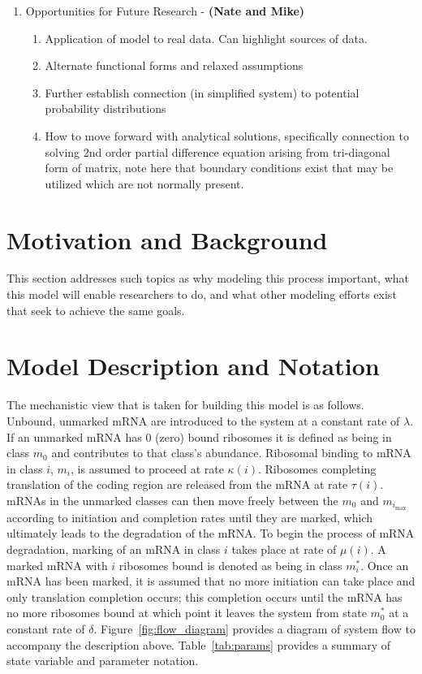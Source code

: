 \documentclass[review]{elsarticle}
\newcommand{\imax}{\ensuremath{i_{\max}}\xspace}
\begin{document}
\begin{enumerate}
\begin{enumerate}
\end{enumerate}
\item Opportunities for Future Research  - \textbf{(Nate and Mike)}
\begin{enumerate}
\item Application of model to real data.
Can highlight sources of data.
\item Alternate functional forms and relaxed assumptions
\item Further establish connection (in simplified system) to potential probability distributions
\item How to move forward with analytical solutions, specifically connection to solving 2nd order partial difference equation arising from tri-diagonal form of matrix, note here that boundary conditions exist that may be utilized which are not normally present.
\end{enumerate}
\end{enumerate}
\newpage
\section{Motivation and Background}
This section addresses such topics as why modeling this process important, what this model will enable researchers to do, and what other modeling efforts exist that seek to achieve the same goals.

\section{Model Description and Notation}\label{sec:description}
The mechanistic view that is taken for building this model is as follows.
Unbound, unmarked mRNA are introduced to the system at a constant rate of $\lambda$.
If an unmarked mRNA has 0 (zero) bound ribosomes it is defined as being in class $m_0$ and contributes to that class's abundance.
Ribosomal binding to mRNA in class $i$, $m_i$, is assumed to proceed at rate $\kappa(i)$.
Ribosomes completing translation of the coding region are released from the mRNA at rate $\tau(i)$.  
mRNAs in the unmarked classes can then move freely between the $m_0$ and $m_{\imax}$ according to initiation and completion rates until they are marked, which ultimately leads to the degradation of the mRNA.
To begin the process of mRNA degradation, marking of an mRNA in class $i$ takes place at rate of $\mu(i)$.
A marked mRNA with $i$ ribosomes bound is denoted as being in class $m_i^*$.
Once an mRNA has been marked, it is assumed that no more initiation can take place and only translation completion occurs; this completion occurs until the mRNA has no more ribosomes bound at which point it leaves the system from state $m_0^*$ at a constant rate of $\delta$.
Figure~\ref{fig:flow_diagram} provides a diagram of system flow to accompany the description above.
Table~\ref{tab:params} provides a summary of state variable and parameter notation.
\end{document}
